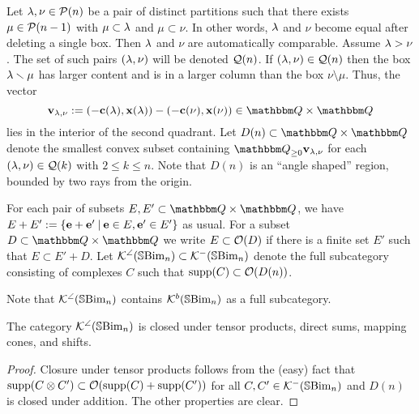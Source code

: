 Let $\lambda,\nu\in {\mathcal{P}}(n)$ be a pair of distinct partitions such that there exists $\mu\in {\mathcal{P}}(n-1)$ with $\mu\subset \lambda$ and $\mu\subset \nu$.  In other words, $\lambda$ and $\nu$ become equal after deleting a single box.  Then $\lambda$ and $\nu$ are automatically comparable. Assume $\lambda>\nu$.  The set of such pairs $(\lambda,\nu)$ will be denoted ${\mathcal{Q}}(n)$.  If $(\lambda,\nu)\in {\mathcal{Q}}(n)$ then the box $\lambda\smallsetminus \mu$ has larger content and is in a larger column than the box $\nu\setminus \mu$.   Thus, the vector
\[
\vb_{\l,\nu}:= (-\cbb(\l),\xbb(\l))-(-\cbb(\nu),\xbb(\nu))\in\Q\times \Q
\]
lies in the interior of the second quadrant.  Let $D(n)\subset \Q\times \Q$ denote the smallest convex subset containing $\Q_{\geq 0}\vb_{\l,\nu}$ for each $(\lambda,\nu)\in {\mathcal{Q}}(k)$ with $2\leq k\leq n$.  Note that $D(n)$ is an ``angle shaped'' region, bounded by two rays from the origin.

For each pair of subsets $E,E'\subset \Q\times \Q$, we have $E+E':=\{{\mathbf e}+{\mathbf e}'\:|\: {\mathbf e}\in E, {\mathbf e}'\in E'\}$ as usual.  For a subset $D\subset \Q\times \Q$ we write $E\subset {\mathcal{O}}(D)$ if there is a finite set $E'$ such that $E\subset E'+D$.  Let ${\mathcal{K}}^{\angle}({\mathbb{S}}{\rm Bim }_n)\subset{\mathcal{K}}^-({\mathbb{S}}{\rm Bim }_n)$ denote the full subcategory consisting of complexes $C$ such that $\operatorname{supp}(C)\subset {\mathcal{O}}(D(n))$.

Note that ${\mathcal{K}}^{\angle}({\mathbb{S}}{\rm Bim }_n)$ contains ${\mathcal{K}}^b({\mathbb{S}}{\rm Bim }_n)$ as a full subcategory.

\begin{lemma}
The category ${\mathcal{K}}^{\angle}({\mathbb{S}}{\rm Bim }_n)$ is closed under tensor products, direct sums, mapping cones, and shifts.
\end{lemma}
\begin{proof}
Closure under tensor products follows from the (easy) fact that $\operatorname{supp}(C\otimes C')\subset {\mathcal{O}}(\operatorname{supp}(C)+\operatorname{supp}(C'))$ for all $C,C'\in {\mathcal{K}}^-({\mathbb{S}}{\rm Bim }_n)$ and $D(n)$ is closed under addition.  The other properties are clear.
\end{proof}

